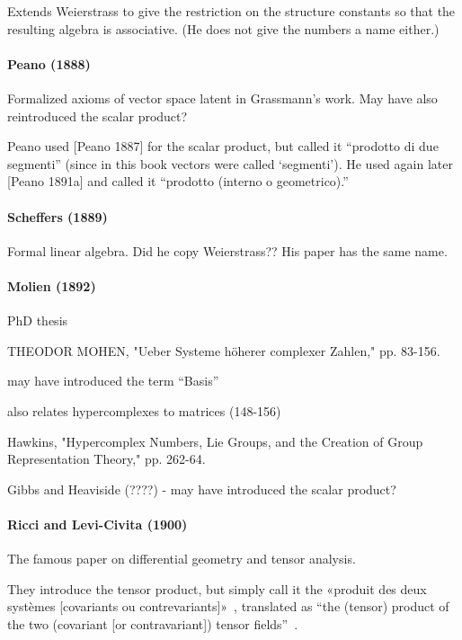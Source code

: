 Extends Weierstrass to give the restriction on the structure constants so that the resulting algebra is associative. (He does not give the numbers a name either.)



\paragraph{Peano (1888)~\cite{Peano1888}}

Formalized axioms of vector space latent in Grassmann's work.
May have also reintroduced the scalar product?

Peano used [Peano 1887]
for the scalar product, but called it “prodotto di due segmenti” (since in this book vectors
were called ‘segmenti’). He used
again later [Peano 1891a] and called it “prodotto
(interno o geometrico).”



\paragraph{Scheffers (1889)~\cite{Scheffers1889}}

Formal linear algebra. Did he copy Weierstrass?? His paper has the same name.



\paragraph{Molien (1892)}

PhD thesis

THEODOR MOHEN, "Ueber Systeme höherer complexer Zahlen," pp. 83-156.

may have introduced the term ``Basis''

also relates hypercomplexes to matrices (148-156)

Hawkins, "Hypercomplex Numbers, Lie Groups, and the
Creation of Group Representation Theory," pp. 262-64.

Gibbs and Heaviside (????) - may have introduced the scalar product?



\paragraph{Ricci and Levi-Civita (1900)~\cite{Ricci1900,Hermann1975}}

The famous paper on differential geometry and tensor analysis.

They introduce the tensor product, but simply call it the
«produit des deux systèmes [covariants ou contrevariants]»~\cite[p. 133]{Ricci1900}, translated as
``the (tensor) product of the two (covariant [or contravariant]) tensor fields''~\cite[p. 28]{Hermann1975}.

